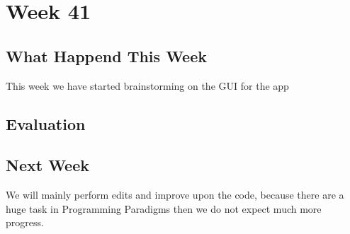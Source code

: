 \section*{Week 41}
\subsection*{What Happend This Week}
This week we have started brainstorming on the \ac{GUI} for the app  

\subsection*{Evaluation}


\subsection*{Next Week}
We will mainly perform edits and improve upon the code, because there are a huge
task in Programming Paradigms then we do not expect much more progress.



% 
% 
% 

